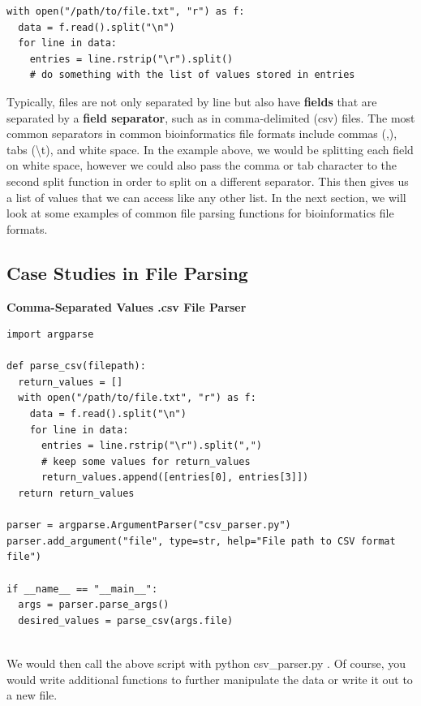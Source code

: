 \documentclass[a4paper,11pt]{article}
\begin{document}
\vspace{3mm}
\begin{lstlisting}
with open("/path/to/file.txt", "r") as f:
  data = f.read().split("\n")
  for line in data:
    entries = line.rstrip("\r").split()
    # do something with the list of values stored in entries
\end{lstlisting}
\vspace{3mm}

Typically, files are not only separated by line but also have \textbf{fields} that are separated by a 
\textbf{field separator}, such as in comma-delimited (csv) files.  The most common separators in common 
bioinformatics file formats include commas (,), tabs (\textbackslash{}t), and white space.  In the example above, 
we would be splitting each field on white space, however we could also pass the comma or tab character 
to the second split function in order to split on a different separator.  This then gives us a list of 
values that we can access like any other list.  In the next section, we will look at some examples 
of common file parsing functions for bioinformatics file formats.

\pagebreak
\subsection{Case Studies in File Parsing}
\textbf{Comma-Separated Values .csv File Parser}

\vspace{3mm}
\begin{lstlisting}
import argparse

def parse_csv(filepath):
  return_values = []
  with open("/path/to/file.txt", "r") as f:
    data = f.read().split("\n")
    for line in data:
      entries = line.rstrip("\r").split(",")
      # keep some values for return_values
      return_values.append([entries[0], entries[3]])
  return return_values

parser = argparse.ArgumentParser("csv_parser.py")
parser.add_argument("file", type=str, help="File path to CSV format file")

if __name__ == "__main__":
  args = parser.parse_args()
  desired_values = parse_csv(args.file)
  
\end{lstlisting}
\vspace{3mm}

We would then call the above script with 
python csv\_parser.py .
Of course, you would write additional functions to further manipulate the data or write it out 
to a new file.
\end{document}
